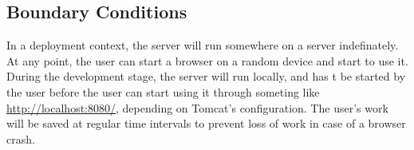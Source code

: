 \documentclass[a4paper]{article}
\begin{document}


\subsection{Boundary Conditions}

In a deployment context, the server will run somewhere on a server indefinately. At any point, the user can start a browser on a random device and start to use it.
During the development stage, the server will run locally, and has t be started by the user before the user can start using it through someting like \url{http://localhost:8080/}, depending on Tomcat's configuration.
The user's work will be saved at regular time intervals to prevent loss of work in case of a browser crash.
\end{document}

